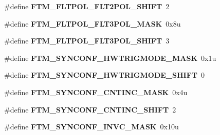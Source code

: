 \begin{DoxyCompactItemize}
\item 
\hypertarget{group___f_t_m___register___masks_gadf4358730058b9bf99f5e8cfde4bd482}{}\#define {\bfseries F\+T\+M\+\_\+\+F\+L\+T\+P\+O\+L\+\_\+\+F\+L\+T2\+P\+O\+L\+\_\+\+S\+H\+I\+F\+T}~2\label{group___f_t_m___register___masks_gadf4358730058b9bf99f5e8cfde4bd482}

\item 
\hypertarget{group___f_t_m___register___masks_ga56880809c7351258a92bf4f55b1b43d0}{}\#define {\bfseries F\+T\+M\+\_\+\+F\+L\+T\+P\+O\+L\+\_\+\+F\+L\+T3\+P\+O\+L\+\_\+\+M\+A\+S\+K}~0x8u\label{group___f_t_m___register___masks_ga56880809c7351258a92bf4f55b1b43d0}

\item 
\hypertarget{group___f_t_m___register___masks_gaf5b8746ad3ae33f546df51f36e833b44}{}\#define {\bfseries F\+T\+M\+\_\+\+F\+L\+T\+P\+O\+L\+\_\+\+F\+L\+T3\+P\+O\+L\+\_\+\+S\+H\+I\+F\+T}~3\label{group___f_t_m___register___masks_gaf5b8746ad3ae33f546df51f36e833b44}

\item 
\hypertarget{group___f_t_m___register___masks_ga60729d222bbb0fe4e36011bd682f4f82}{}\#define {\bfseries F\+T\+M\+\_\+\+S\+Y\+N\+C\+O\+N\+F\+\_\+\+H\+W\+T\+R\+I\+G\+M\+O\+D\+E\+\_\+\+M\+A\+S\+K}~0x1u\label{group___f_t_m___register___masks_ga60729d222bbb0fe4e36011bd682f4f82}

\item 
\hypertarget{group___f_t_m___register___masks_gaf56e2a17c8f817aa682fb4ad72873d74}{}\#define {\bfseries F\+T\+M\+\_\+\+S\+Y\+N\+C\+O\+N\+F\+\_\+\+H\+W\+T\+R\+I\+G\+M\+O\+D\+E\+\_\+\+S\+H\+I\+F\+T}~0\label{group___f_t_m___register___masks_gaf56e2a17c8f817aa682fb4ad72873d74}

\item 
\hypertarget{group___f_t_m___register___masks_gafeaceffaaecca1ef7e96a19e21e974fb}{}\#define {\bfseries F\+T\+M\+\_\+\+S\+Y\+N\+C\+O\+N\+F\+\_\+\+C\+N\+T\+I\+N\+C\+\_\+\+M\+A\+S\+K}~0x4u\label{group___f_t_m___register___masks_gafeaceffaaecca1ef7e96a19e21e974fb}

\item 
\hypertarget{group___f_t_m___register___masks_ga44117438734ea92c0ec67dc7be294074}{}\#define {\bfseries F\+T\+M\+\_\+\+S\+Y\+N\+C\+O\+N\+F\+\_\+\+C\+N\+T\+I\+N\+C\+\_\+\+S\+H\+I\+F\+T}~2\label{group___f_t_m___register___masks_ga44117438734ea92c0ec67dc7be294074}

\item 
\hypertarget{group___f_t_m___register___masks_ga64738e805ee6dc280986acc586530f28}{}\#define {\bfseries F\+T\+M\+\_\+\+S\+Y\+N\+C\+O\+N\+F\+\_\+\+I\+N\+V\+C\+\_\+\+M\+A\+S\+K}~0x10u\label{group___f_t_m___register___masks_ga64738e805ee6dc280986acc586530f28}


\end{DoxyCompactItemize}
